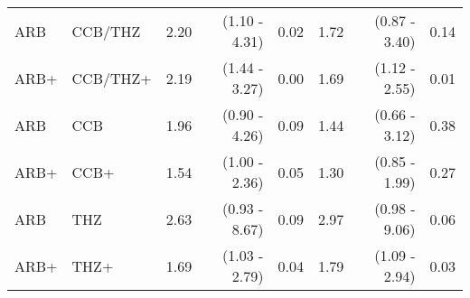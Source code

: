 \documentclass[11pt,]{article}
\begin{document}
\begin{table}[H]
{\begin{tabular}{llrrrrrr}
  ARB & CCB/THZ & 2.20 & (1.10 - 4.31) & 0.02 & 1.72 & (0.87 - 3.40) & 0.14 \\ 
  ARB+ & CCB/THZ+ & 2.19 & (1.44 - 3.27) & 0.00 & 1.69 & (1.12 - 2.55) & 0.01 \\ 
  ARB & CCB & 1.96 & (0.90 - 4.26) & 0.09 & 1.44 & (0.66 - 3.12) & 0.38 \\ 
  ARB+ & CCB+ & 1.54 & (1.00 - 2.36) & 0.05 & 1.30 & (0.85 - 1.99) & 0.27 \\ 
  ARB & THZ & 2.63 & (0.93 - 8.67) & 0.09 & 2.97 & (0.98 - 9.06) & 0.06 \\ 
  ARB+ & THZ+ & 1.69 & (1.03 - 2.79) & 0.04 & 1.79 & (1.09 - 2.94) & 0.03 \\ 
    \bottomrule
  \end{tabular}
  }
\end{table}
\begin{table}[H]
 \caption{Risk estimates for COVID-19 hospitalization across propensity score stratifed, prevalent-user cohorts in the CUIMC data source. We report uncalibrated and calibrated hazard ratios (HRs) and their 95\% confidence intervals (CIs). (+) indicates in-combination cohorts.}
\end{table}
\end{document}
